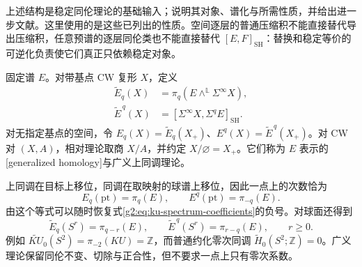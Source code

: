 \ProseParagraphBreak

上述结构是稳定同伦理论的基础输入；\cite[第25章第6—7节]{May1999}说明其对象、谱化与所需性质，并给出进一步文献。这里使用的是这些已列出的性质。空间逐层的普通压缩积不能直接替代导出压缩积，任意预谱的逐层同伦类也不能直接替代 \([E,F]_{\mathrm{SH}}\)：替换和稳定等价的可逆化负责使它们真正只依赖稳定对象。

\begin{definition}\label{g2:def:spectrum-generalized-theories}
	固定谱 \(E\)。对带基点 CW 复形 \(X\)，定义
	\begin{align}
		\widetilde E_q(X)&=\pi_q(E\wedge^{\mathbb L}\Sigma^\infty X),\label{g2:eq:spectrum-homology}\\
		\widetilde E^{\,q}(X)&=[\Sigma^\infty X,\Sigma^q E]_{\mathrm{SH}}.\label{g2:eq:spectrum-cohomology}
	\end{align}
	对无指定基点的空间，令 \(E_q(X)=\widetilde E_q(X_+)\)、\(E^q(X)=\widetilde E^{\,q}(X_+)\)。对 CW 对 \((X,A)\)，相对理论取商 \(X/A\)，并约定 \(X/\varnothing=X_+\)。它们称为 \(E\) 表示的[generalized homology]与广义上同调理论。
\end{definition}

上同调在目标上移位，同调在取映射的球谱上移位，因此一点上的次数恰为
\[
	E_q(\mathrm{pt})=\pi_q(E),\qquad
	E^q(\mathrm{pt})=\pi_{-q}(E).
\]
由这个等式可以随时恢复式\eqref{g2:eq:ku-spectrum-coefficients}的负号。对球面还得到
\begin{equation}\label{g2:eq:generalized-sphere-groups}
	\widetilde E_q(S^r)=\pi_{q-r}(E),\qquad
	\widetilde E^{\,q}(S^r)=\pi_{r-q}(E),\qquad r\ge0.
\end{equation}
例如 \(\widetilde{KU}_0(S^2)=\pi_{-2}(KU)=\mathbb Z\)，而普通约化零次同调 \(\widetilde H_0(S^2;\mathbb Z)=0\)。广义理论保留同伦不变、切除与正合性，但不要求一点上只有零次系数。

